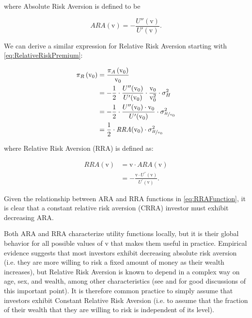 \documentclass[graybox,envcountchap,sectrefs]{svmono}\usepackage[]{graphicx}\usepackage[]{xcolor}
\begin{document}
\begin{appendices}
where Absolute Risk Aversion is defined to be 

\begin{equation}
\mathrm{\mathit{ARA}(\mathit{\mathrm{v}})}=-\frac{\mathrm{\mathit{U}''(\mathrm{v})}}{\mathrm{\mathit{U}'(\mathit{\mathrm{v}})}}.\label{eq: ARAfunction}
\end{equation}

We can derive a similar expression for Relative Risk Aversion starting
with \eqref{eq:RelativeRiskPremium}:

\begin{align}
\pi_{R}\left(\mathrm{v}_{0}\right) & =\frac{\pi_{A}\left(\mathrm{v}_{0}\right)}{\mathrm{v}_{0}}\nonumber \\
 & =-\frac{1}{2}\cdot\frac{U^{\prime\prime}(\mathrm{v}_{0})}{U^{\prime}(\mathrm{v}_{0})}\cdot\frac{\mathrm{v}_{0}}{\mathrm{v}_{0}^{2}}\cdot\sigma_{H}^{2}\nonumber \\
 & =-\frac{1}{2}\cdot\frac{U^{\prime\prime}(\mathrm{v}_{0})\cdot\mathrm{v}_{0}}{U^{\prime}(\mathrm{v}_{0})}\cdot\sigma_{\nicefrac{H}{\mathrm{v}_{0}}}^{2}\nonumber \\
 & =\frac{1}{2}\cdot\mathrm{\mathit{RRA}(\mathrm{v}_{0})\cdot\sigma_{\nicefrac{H}{\mathrm{v}_{0}}}^{2}}\label{eq:UtilityTaylorSeries6}
\end{align}

where Relative Risk Aversion (RRA) is defined as:

\begin{align}
\mathrm{\mathit{RRA}(\mathit{\mathrm{v}})} & =\mathrm{v}\cdot ARA(\mathit{\mathrm{v}})\nonumber \\
 & =-\frac{\mathrm{v}\cdot\mathrm{\mathit{U}^{\prime\prime}(\mathrm{v})}}{\mathrm{\mathit{U}^{\prime}(\mathit{\mathrm{v}})}}.\label{eq:RRAFunction}
\end{align}

Given the relationship between ARA and RRA functions in \eqref{eq:RRAFunction},
it is clear that a constant relative risk aversion (CRRA) investor
must exhibit decreasing ARA.

Both ARA and RRA characterize utility functions locally, but it is
their global behavior for all possible values of $\mathrm{v}$ that
makes them useful in practice. Empirical evidence suggests that most
investors exhibit decreasing absolute risk aversion (i.e. they are
more willing to risk a fixed amount of money as their wealth increases),
but Relative Risk Aversion is known to depend in a complex way on
age, sex, and wealth, among other characteristics (see \citet{BellanteGreen2004}
and \citet{HalekEisenhauer2001} for good discussions of this important
point). It is therefore common practice to simply assume that investors
exhibit Constant Relative Risk Aversion (i.e. to assume that the fraction
of their wealth that they are willing to risk is independent of its
level). 


\end{appendices}
\end{document}
